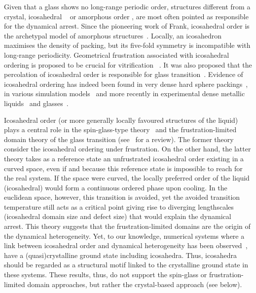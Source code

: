 Given that a glass shows no long-range periodic order, structures different from a crystal, icosahedral  ~\cite{steinhardt1983boo,tarjus2005fba} or amorphous order \cite{lubchenko2007}, are most often pointed as responsible for the dynamical arrest. Since the pioneering work of Frank, icosahedral order is the archetypal model of amorphous structures~\citep{Spaepen2000}. Locally, an icosahedron maximises the density of packing, but its five-fold symmetry is incompatible with long-range periodicity. Geometrical frustration associated with icosahedral ordering is proposed to be crucial for vitrification ~\cite{steinhardt1983boo,tarjus2005fba}. It was also proposed that the percolation of icosahedral order is responsible for glass transition~\cite{Tomida1995}.  Evidence of icosahedral ordering has indeed been found in very dense hard sphere packings~\citep{Bernal1960, Clarke1993, Malshe2011}, in various simulation models~\citep{steinhardt1983boo, Tomida1995, Doye2003, Pedersen2010, Coslovich2011} and more recently in experimental dense metallic liquids~\citep{Reichert2000, Celino2007} and glasses~\citep{Luo2004, Wang2011}.

Icosahedral order (or more generally locally favoured structures of the liquid) plays a central role in the spin-glass-type theory~\cite{steinhardt1983boo} and the frustration-limited domain theory of the glass transition (see~\citep{tarjus2005fba} for a review). The former theory consider the icosahedral ordering under frustration. On the other hand, the latter theory takes as a reference state an unfrustrated icosahedral order existing in a curved space, even if and because this reference state is impossible to reach for the real system. If the space were curved, the locally preferred order of the liquid (icosahedral) would form a continuous ordered phase upon cooling. In the  euclidean space, however, this transition is avoided, yet the avoided transition temperature still acts as a critical point giving rise to diverging lengthscales (icosahedral domain size and defect size) that would explain the dynamical arrest. This theory suggests that the frustration-limited domains are the origin of the dynamical heterogeneity. Yet, to our knowledge, numerical systems where a link between icosahedral order and dynamical heterogeneity has been observed~\citep{Doye2003, Pedersen2010, Coslovich2011}, have a (quasi)crystalline ground state including icosahedra. Thus, icosahedra should be regarded as a structural motif linked to the crystalline ground state in these systems. These results, thus, do not support the spin-glass or frustration-limited domain approaches, but rather the crystal-based approach (see below).  


